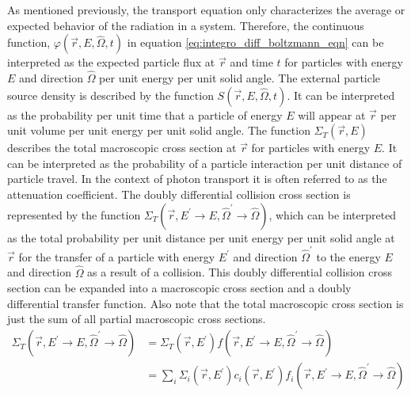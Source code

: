 As mentioned previously, the transport equation only characterizes the average
or expected behavior of the radiation in a system. Therefore, the
continuous function, $\varphi(\vec{r},E,\hat{\Omega},t)$ in equation 
\ref{eq:integro_diff_boltzmann_eqn} can be interpreted as the expected particle 
flux at $\vec{r}$ and time $t$ for particles with energy $E$ and direction
$\hat{\Omega}$ per unit energy per unit solid angle. The external particle 
source density is described by the function $S(\vec{r},E,\hat{\Omega},t)$. It 
can be interpreted as the probability per unit time that a particle of energy 
$E$ will appear at $\vec{r}$ per unit volume per unit energy per unit solid 
angle. The function $\Sigma_T(\vec{r},E)$ describes the total macroscopic cross 
section at $\vec{r}$ for particles with energy $E$. It can be interpreted as the
probability of a particle interaction per unit distance of particle travel. In 
the context of photon transport it is often referred to as the attenuation 
coefficient. The doubly differential collision cross section is represented by 
the function $\Sigma_T(\vec{r},E^{'} \to E,\hat{\Omega}^{'} \to \hat{\Omega})$, 
which can be interpreted as the total probability per unit distance per unit 
energy per unit solid angle at $\vec{r}$ for the transfer of a particle with 
energy $E^{'}$ and direction $\hat{\Omega}^{'}$ to the energy $E$ and direction 
$\hat{\Omega}$ as a result of a collision. This doubly differential collision 
cross section can be expanded into a macroscopic cross section and a doubly 
differential transfer function. Also note that the total macroscopic cross 
section is just the sum of all partial macroscopic cross sections.
\begin{align}
  \Sigma_T(\vec{r},E^{'} \to E,\hat{\Omega}^{'} \to \hat{\Omega}) & =
  \Sigma_T(\vec{r},E^{'})
  f(\vec{r},E^{'} \to E,\hat{\Omega}^{'} \to \hat{\Omega}) \\
  & = \sum_i \Sigma_i(\vec{r},E^{'}) c_i(\vec{r},E^{'})
  f_i(\vec{r},E^{'} \to E,\hat{\Omega}^{'} \to \hat{\Omega})
  \label{eq:expanded_diff_collision_cross_sec}
\end{align}

